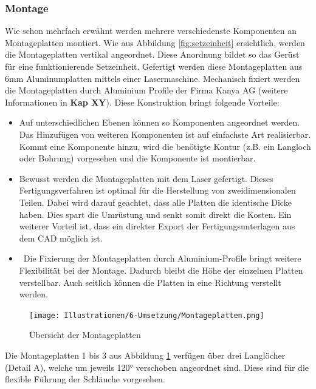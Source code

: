 \subsubsection{Montage}
Wie schon mehrfach erwähnt werden mehrere verschiedenste Komponenten an Montageplatten montiert. Wie aus Abbildung \ref{fig:setzeinheit} ersichtlich, werden die Montageplatten vertikal angeordnet. Diese Anordnung bildet so das Gerüst für eine funktionierende Setzeinheit. Gefertigt werden diese Montageplatten aus 6mm Aluminumplatten mittels einer Lasermaschine. Mechanisch fixiert werden die Montageplatten durch Aluminium Profile der Firma Kanya AG (weitere Informationen in \textbf{Kap XY}). Diese Konstruktion bringt folgende Vorteile:
	\begin{itemize}
	\item Auf unterschiedlichen Ebenen können so Komponenten angeordnet werden. Das Hinzufügen von weiteren Komponenten ist auf einfachste Art realisierbar. Kommt eine Komponente hinzu, wird die benötigte Kontur (z.B. ein Langloch oder Bohrung) vorgesehen und die Komponente ist montierbar.
	\item Bewusst werden die Montageplatten mit dem Laser gefertigt. Dieses Fertigungsverfahren ist optimal für die Herstellung von zweidimensionalen Teilen. Dabei wird darauf geachtet, dass alle Platten die identische Dicke haben. Dies spart die Umrüstung und senkt somit direkt die Kosten. Ein weiterer Vorteil ist, dass ein direkter Export der Fertigungsunterlagen aus dem CAD möglich ist.
	\item \ Die Fixierung der Montageplatten durch Aluminium-Profile bringt weitere Flexibilität bei der Montage. Dadurch bleibt die Höhe der einzelnen Platten verstellbar. Auch seitlich können die Platten in eine Richtung verstellt werden.
\end{itemize}
 	\begin{figure}[H]
	\texttt{[image: Illustrationen/6-Umsetzung/Montageplatten.png]}
	\caption{Übersicht der Montageplatten}
	\label{fig:montageplatten}
\end{figure}
Die Montageplatten 1 bis 3 aus Abbildung \ref{fig:montageplatten} verfügen über drei Langlöcher (Detail A), welche um jeweils 120° verschoben angeordnet sind. Diese sind für die flexible Führung der Schläuche vorgesehen.